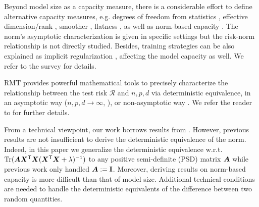  Beyond model size as a capacity measure, there is a considerable effort to  define alternative capacity measures,  e.g. degrees of freedom from statistics \citep{efron1986biased, efron2004estimation,patil2024revisiting}, effective dimension/rank \citep{zhang2002effective,bartlett2020benign}, smoother \citep{curth2024u}, flatness \citep{petzka2021relative}, as well as norm-based capacity \citep{neyshabur2015norm,liu2024learning}. 
The norm's asymptotic characterization is given in specific settings \citep{hu2024asymptotics} but the risk-norm relationship is not directly studied. Besides, training strategies can be also explained as implicit regularization \citep{yao2007early,neyshabur2014search}, affecting the model capacity as well. We refer to the survey \cite{jiang2019fantastic} for details.

RMT provides powerful mathematical tools to precisely characterize the relationship between the test risk $\mathcal{R}$ and $n,p,d$ via deterministic equivalence, in an asymptotic way ($n,p,d \rightarrow \infty$, \citealt{mei2022generalization,ghorbani2021linearized,wu2020optimal,xiao2022precise,bach2024high}), or non-asymptotic way \citep{hastie2022surprises,cheng2022dimension,misiakiewicz2024non}. 
We refer the reader to \citet{couillet2022random} for further details.

From a technical viewpoint, our work borrows results from  \citet{bach2024high,misiakiewicz2024non,defilippis2024dimension}.
However,  previous results are not insufficient to  derive the deterministic equivalence of the norm. 
Indeed,  in this paper we generalize the deterministic equivalence w.r.t.\ \({\rm Tr}({\boldsymbol A} {\boldsymbol X}^{\mathsf T}{\boldsymbol X}({\boldsymbol X}^{\mathsf T}{\boldsymbol X} + \lambda)^{-1})\) to any positive semi-definite (PSD) matrix ${\boldsymbol A}$ while previous work only handled $\bm A := {\mathbf I}$.
Moreover, deriving results on norm-based capacity is more difficult than that of model size.  Additional technical conditions are needed to handle the deterministic equivalents of the difference between two random quantities.